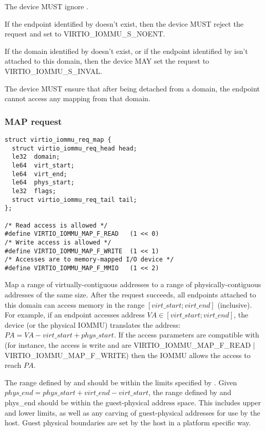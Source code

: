 The device MUST ignore .

If the endpoint identified by  doesn't exist, then the
device MUST reject the request and set  to
VIRTIO_IOMMU_S_NOENT.

If the domain identified by  doesn't exist, or if the
endpoint identified by  isn't attached to this domain,
then the device MAY set the request  to
VIRTIO_IOMMU_S_INVAL.

The device MUST ensure that after being detached from a domain, the
endpoint cannot access any mapping from that domain.

\subsubsection{MAP request}\label{sec:Device Types / IOMMU Device / Device operations / MAP request}

\begin{lstlisting}
struct virtio_iommu_req_map {
  struct virtio_iommu_req_head head;
  le32  domain;
  le64  virt_start;
  le64  virt_end;
  le64  phys_start;
  le32  flags;
  struct virtio_iommu_req_tail tail;
};

/* Read access is allowed */
#define VIRTIO_IOMMU_MAP_F_READ   (1 << 0)
/* Write access is allowed */
#define VIRTIO_IOMMU_MAP_F_WRITE  (1 << 1)
/* Accesses are to memory-mapped I/O device */
#define VIRTIO_IOMMU_MAP_F_MMIO   (1 << 2)
\end{lstlisting}

Map a range of virtually-contiguous addresses to a range of
physically-contiguous addresses of the same size. After the request
succeeds, all endpoints attached to this domain can access memory in the
range $[virt\_start; virt\_end]$ (inclusive). For example, if an endpoint
accesses address $VA \in [virt\_start; virt\_end]$, the device (or the
physical IOMMU) translates the address: $PA = VA - virt\_start +
phys\_start$. If the access parameters are compatible with 
(for instance, the access is write and  are
VIRTIO_IOMMU_MAP_F_READ | VIRTIO_IOMMU_MAP_F_WRITE) then the IOMMU allows
the access to reach $PA$.

The range defined by  and  should be
within the limits specified by . Given $phys\_end =
phys\_start + virt\_end - virt\_start$, the range defined by
 and phys_end should be within the guest-physical
address space. This includes upper and lower limits, as well as any
carving of guest-physical addresses for use by the host. Guest physical
boundaries are set by the host in a platform specific way.


